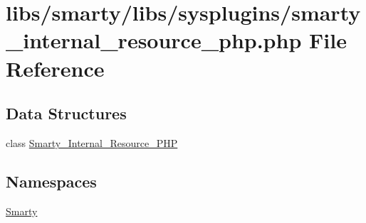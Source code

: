 \hypertarget{smarty__internal__resource__php_8php}{}\section{libs/smarty/libs/sysplugins/smarty\+\_\+internal\+\_\+resource\+\_\+php.php File Reference}
\label{smarty__internal__resource__php_8php}
\subsection*{Data Structures}
\begin{DoxyCompactItemize}
\item 
class \hyperlink{class_smarty___internal___resource___p_h_p}{Smarty\+\_\+\+Internal\+\_\+\+Resource\+\_\+\+P\+H\+P}
\end{DoxyCompactItemize}
\subsection*{Namespaces}
\begin{DoxyCompactItemize}
\item 
 \hyperlink{namespace_smarty}{Smarty}
\end{DoxyCompactItemize}
